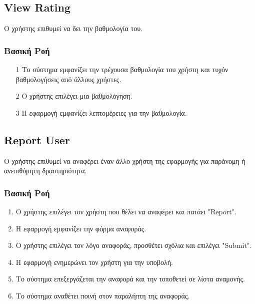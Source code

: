 \newpage

\subsection{View Rating}
\label{uc:view-rating}

Ο χρήστης επιθυμεί να δει την βαθμολογία του.

\subsubsection{Βασική Ροή}

\begin{enumerate}
    \item[1] Το σύστημα εμφανίζει την τρέχουσα βαθμολογία του χρήστη και τυχόν βαθμολογήσεις από
        άλλους χρήστες.
    \item[2] Ο χρήστης επιλέγει μια βαθμολόγηση.
    \item[3] Η εφαρμογή εμφανίζει λεπτομέρειες για την βαθμολογία.
\end{enumerate}

\newpage

\subsection{Report User}
\label{uc:report-user}

Ο χρήστης επιθυμεί να αναφέρει έναν άλλο χρήστη της εφαρμογής για
παράνομη ή ανεπιθύμητη δραστηριότητα.

\subsubsection{Βασική Ροή}

\begin{enumerate}
    \item Ο χρήστης επιλέγει τον χρήστη που θέλει να αναφέρει και πατάει "Report".
    \item H εφαρμογή εμφανίζει την φόρμα αναφοράς.
    \item Ο χρήστης επιλέγει τον λόγο αναφοράς, προσθέτει σχόλια και επιλέγει "Submit".
    \item Η εφαρμογή ενημερώνει τον χρήστη για την υποβολή.
    \item Το σύστημα επεξεργάζεται την αναφορά και την τοποθετεί σε λίστα αναμονής.
    \item Το σύστημα αναθέτει ποινή στον παραλήπτη της αναφοράς.
\end{enumerate}

